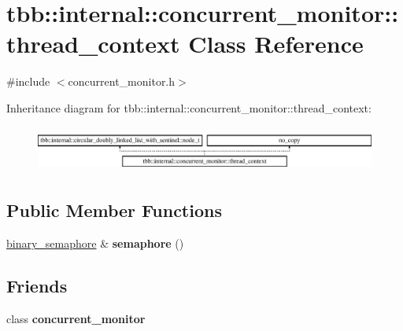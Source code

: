 \hypertarget{classtbb_1_1internal_1_1concurrent__monitor_1_1thread__context}{}\section{tbb\+:\+:internal\+:\+:concurrent\+\_\+monitor\+:\+:thread\+\_\+context Class Reference}
\label{classtbb_1_1internal_1_1concurrent__monitor_1_1thread__context}


{\ttfamily \#include $<$concurrent\+\_\+monitor.\+h$>$}

Inheritance diagram for tbb\+:\+:internal\+:\+:concurrent\+\_\+monitor\+:\+:thread\+\_\+context\+:\begin{figure}[H]
\begin{center}
\leavevmode
\includegraphics[height=1.534247cm]{classtbb_1_1internal_1_1concurrent__monitor_1_1thread__context}
\end{center}
\end{figure}
\subsection*{Public Member Functions}
\begin{DoxyCompactItemize}
\item 
\hypertarget{classtbb_1_1internal_1_1concurrent__monitor_1_1thread__context_aefaf66a82d69cc8daf22ca74d0e8d310}{}\hyperlink{classtbb_1_1internal_1_1binary__semaphore}{binary\+\_\+semaphore} \& {\bfseries semaphore} ()\label{classtbb_1_1internal_1_1concurrent__monitor_1_1thread__context_aefaf66a82d69cc8daf22ca74d0e8d310}

\end{DoxyCompactItemize}
\subsection*{Friends}
\begin{DoxyCompactItemize}
\item 
\hypertarget{classtbb_1_1internal_1_1concurrent__monitor_1_1thread__context_ac67cb16b9c3fc3b8ca630636364dcbdf}{}class {\bfseries concurrent\+\_\+monitor}\label{classtbb_1_1internal_1_1concurrent__monitor_1_1thread__context_ac67cb16b9c3fc3b8ca630636364dcbdf}

\end{DoxyCompactItemize}


